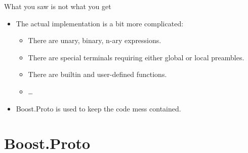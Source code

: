 \documentclass[@BEAMER_OPTIONS@]{beamer}
\begin{document}
\note{ }

\begin{frame}[fragile]{What you saw is not what you get}
    \begin{itemize}
        \item The actual implementation is a bit more complicated:
            \begin{itemize}
                \item There are unary, binary, n-ary expressions.
                \item There are special terminals requiring either global or
                    local preambles.
                \item There are builtin and user-defined functions.
                \item \ldots
            \end{itemize}
        \item Boost.Proto is used to keep the code mess contained.
    \end{itemize}
\end{frame}


\section{Boost.Proto}
\end{document}
